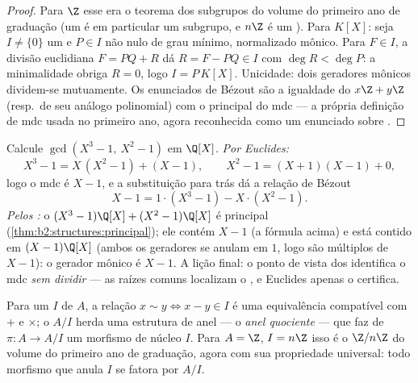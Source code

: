 \begin{proof}
Para $\Z$ esse era o teorema dos subgrupos do volume do primeiro ano de graduação (um 
é em particular um subgrupo, e $n\Z$ é um ). Para $K[X]$: seja
$I \neq \{0\}$ um  e $P \in I$ não nulo de grau mínimo,
normalizado mônico. Para $F \in I$, a divisão euclidiana $F = PQ + R$
dá $R = F - PQ \in I$ com $\deg R < \deg P$: a minimalidade obriga $R
= 0$, logo $I = P\,K[X]$. Unicidade: dois geradores mônicos dividem-se
mutuamente. Os enunciados de Bézout são a igualdade do  $x\Z +
y\Z$ (resp.\ de seu análogo polinomial) com o  principal do
mdc --- a própria definição de mdc usada no primeiro ano, agora reconhecida como
um enunciado sobre .
\end{proof}

\begin{example}\label{ex:b2:structures:polygcd}
Calcule $\gcd(X^3 - 1,\ X^2 - 1)$ em $\Q[X]$. \emph{Por Euclides:}
\[
X^3 - 1 = X\,(X^2 - 1) + (X - 1),
\qquad
X^2 - 1 = (X + 1)(X - 1) + 0 ,
\]
logo o mdc é $X - 1$, e a substituição para trás dá a relação de
Bézout
\[
X - 1 = 1\cdot(X^3 - 1) - X\cdot(X^2 - 1).
\]
\emph{Pelos :} o  $(X^3 - 1)\Q[X] + (X^2 - 1)\Q[X]$ é
principal (\cref{thm:b2:structures:principal}); ele contém $X -
1$ (a fórmula acima) e está contido em $(X - 1)\Q[X]$ (ambos os
geradores se anulam em $1$, logo são múltiplos de $X - 1$): o
gerador mônico é $X - 1$. A lição final: o ponto de vista dos 
identifica o mdc \emph{sem dividir} --- as raízes
comuns localizam o , e Euclides apenas o certifica.
\end{example}

\begin{definition}\label{def:b2:structures:quotientring}
Para um  $I$ de $A$, a relação $x \sim y \iff x - y \in I$ é
uma equivalência compatível com $+$ e $\times$; o 
$A/I$ herda uma estrutura de anel --- o \emph{anel
quociente} --- que faz de $\pi \colon A \to A/I$ um
morfismo de núcleo $I$. Para $A = \Z$, $I = n\Z$ isso é o
$\Z/n\Z$ do volume do primeiro ano de graduação, agora com sua propriedade universal: todo
morfismo que anula $I$ se fatora por $A/I$.
\end{definition}

